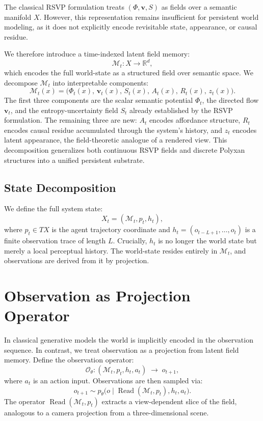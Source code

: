 \documentclass[11pt]{article}
\begin{document}
The classical RSVP formulation treats $(\Phi,\mathbf{v},S)$ as fields over
a semantic manifold $X$.
However, this representation remains insufficient for persistent world
modeling, as it does not explicitly encode revisitable state, appearance,
or causal residue.

We therefore introduce a time-indexed latent field memory:
\[
\mathcal{M}_t : X \to \mathbb{R}^d,
\]
which encodes the full world-state as a structured field over semantic space.
We decompose $\mathcal{M}_t$ into interpretable components:
\[
\mathcal{M}_t(x)
=
\big(
\Phi_t(x),\,
\mathbf{v}_t(x),\,
S_t(x),\,
A_t(x),\,
R_t(x),\,
z_t(x)
\big).
\]
The first three components are the scalar semantic potential $\Phi_t$,
the directed flow $\mathbf{v}_t$, and the entropy-uncertainty field $S_t$
already established by the RSVP formulation.
The remaining three are new: $A_t$ encodes affordance structure,
$R_t$ encodes causal residue accumulated through the system's history,
and $z_t$ encodes latent appearance, the field-theoretic analogue of a
rendered view.
This decomposition generalizes both continuous RSVP fields and discrete
Polyxan structures into a unified persistent substrate.

\subsection{State Decomposition}

We define the full system state:
\[
X_t = (\mathcal{M}_t, p_t, h_t),
\]
where $p_t \in TX$ is the agent trajectory coordinate and
$h_t = (o_{t-L+1},\dots,o_t)$ is a finite observation trace of length $L$.
Crucially, $h_t$ is no longer the world state but merely a local perceptual
history.
The world-state resides entirely in $\mathcal{M}_t$, and observations
are derived from it by projection.

\section{Observation as Projection Operator}

In classical generative models the world is implicitly encoded in the
observation sequence.
In contrast, we treat observation as a projection from latent field memory.
Define the observation operator:
\[
\mathcal{O}_\theta :
(\mathcal{M}_t, p_t, h_t, a_t)
\;\longrightarrow\;
o_{t+1},
\]
where $a_t$ is an action input.
Observations are then sampled via:
\[
o_{t+1} \sim
p_\theta\big(o \mid \operatorname{Read}(\mathcal{M}_t,p_t), h_t, a_t\big).
\]
The operator $\operatorname{Read}(\mathcal{M}_t,p_t)$ extracts a
view-dependent slice of the field, analogous to a camera projection from
a three-dimensional scene.
\end{document}
